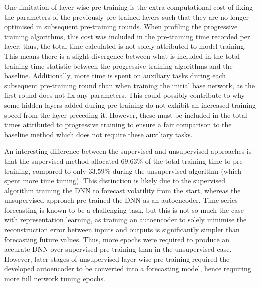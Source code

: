 \documentclass[a4paper, 11pt]{report}
\begin{document}
    One limitation of layer-wise pre-training is the extra computational cost of fixing the parameters of the previously pre-trained layers such that they are no longer optimised in subsequent pre-training rounds. When profiling the progressive training algorithms, this cost was included in the pre-training time recorded per layer; thus, the total time calculated is not solely attributed to model training. This means there is a slight divergence between what is included in the total training time statistic between the progressive training algorithms and the baseline. Additionally, more time is spent on auxiliary tasks during each subsequent pre-training round than when training the initial base network, as the first round does not fix any parameters. This could possibly contribute to why some hidden layers added during pre-training do not exhibit an increased training speed from the layer preceding it. However, these must be included in the total times attributed to progressive training to ensure a fair comparison to the baseline method which does not require these auxiliary tasks.

    An interesting difference between the supervised and unsupervised approaches is that the supervised method allocated $69.63\%$ of the total training time to pre-training, compared to only $33.59\%$ during the unsupervised algorithm (which spent more time tuning). This distinction is likely due to the supervised algorithm training the DNN to forecast volatility from the start, whereas the unsupervised approach pre-trained the DNN as an autoencoder. Time series forecasting is known to be a challenging task, but this is not so much the case with representation learning, as training an autoencoder to solely minimise the reconstruction error between inputs and outputs is significantly simpler than forecasting future values. Thus, more epochs were required to produce an accurate DNN over supervised pre-training than in the unsupervised case. However, later stages of unsupervised layer-wise pre-training required the developed autoencoder to be converted into a forecasting model, hence requiring more full network tuning epochs.
\end{document}
